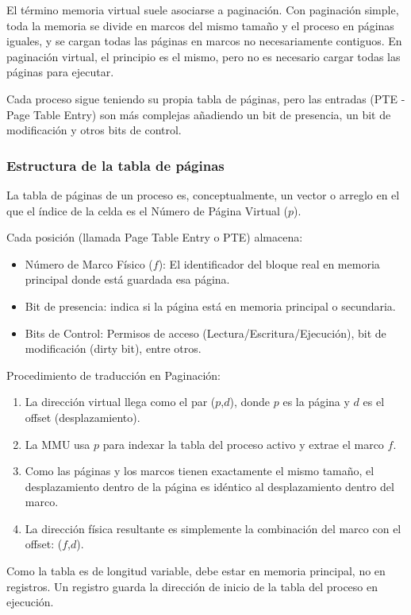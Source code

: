 El término memoria virtual suele asociarse a paginación. Con paginación simple, toda la memoria se divide en marcos del mismo tamaño y el proceso en páginas iguales, y se cargan todas las páginas en marcos no necesariamente contiguos. En paginación virtual, el principio es el mismo, pero no es necesario cargar todas las páginas para ejecutar.

Cada proceso sigue teniendo su propia tabla de páginas, pero las entradas (PTE - Page Table Entry) son más complejas añadiendo un bit de presencia, un bit de modificación y otros bits de control.

\subsubsection{Estructura de la tabla de páginas}

La tabla de páginas de un proceso es, conceptualmente, un vector o arreglo en el que el índice de la celda es el Número de Página Virtual ($p$).

Cada posición (llamada Page Table Entry o PTE) almacena:
\begin{itemize}
  \item Número de Marco Físico ($f$): El identificador del bloque real en memoria principal donde está guardada esa página.
  \item Bit de presencia: indica si la página está en memoria principal o secundaria.
  \item Bits de Control: Permisos de acceso (Lectura/Escritura/Ejecución), bit de modificación (dirty bit), entre otros.
\end{itemize}
Procedimiento de traducción en Paginación:
\begin{enumerate}
  \item La dirección virtual llega como el par ($p$,$d$), donde $p$ es la página y $d$ es el offset (desplazamiento).
  \item La MMU usa \(p\) para indexar la tabla del proceso activo y extrae el marco $f$.
  \item Como las páginas y los marcos tienen exactamente el mismo tamaño, el desplazamiento dentro de la página es idéntico al desplazamiento dentro del marco.
  \item La dirección física resultante es simplemente la combinación del marco con el offset: ($f$,$d$).
\end{enumerate}

Como la tabla es de longitud variable, debe estar en memoria principal, no en registros. Un registro guarda la dirección de inicio de la tabla del proceso en ejecución.

